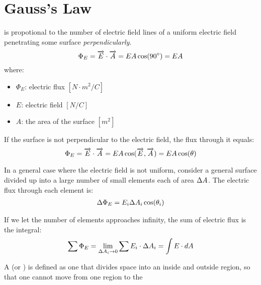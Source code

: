 \chapter{Gauss's Law}
        \par {} is propotional to the number of electric field lines
        of a uniform electric field penetrating some surface \textit{perpendicularly}.
        \begin{equation}
            \Phi_{E} = \overrightarrow{E} \cdot \overrightarrow{A} = EA\cos(90 \degree) = EA
        \end{equation}
        where:
        \begin{itemize}
            \item $\Phi_{E}$: electric flux $[N \cdot m^{2} / C]$
            \item $E$: electric field $[N / C]$
            \item $A$: the area of the surface $[m^{2}]$
        \end{itemize}
        \par If the surface is not perpendicular to the electric field, the flux through it
        equals:
        \begin{equation}
            \Phi_{E} = \overrightarrow{E} \cdot \overrightarrow {A} = EA\cos(\overrightarrow{E}, \overrightarrow{A}) = EA\cos(\theta)
        \end{equation}
        \par In a general case where the electric field is not uniform, consider a general surface
        divided up into a large number of small elements each of area $\Delta A$. The electric flux
        through each element is:
        \begin{align*}
            \Delta \Phi_{E} = E_{i} \Delta A_{i} \cos(\theta_{i})
        \end{align*}
        \par If we let the number of elements approaches infinity, the sum of electric flux is the
        integral:
        \begin{equation}
            \sum \Phi_{E} = \lim_{\Delta A_{i} \to 0} \sum E_{i} \cdot \Delta A_{i} = {\int\limits E \cdot dA}
        \end{equation}
        \par A  (or ) is defined as one that divides
        space into an inside and outside region, so that one cannot move from one region to the
